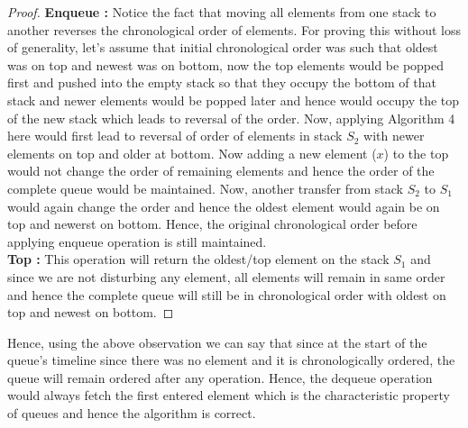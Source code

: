 \documentclass{article}
\begin{document}
{{\begin {proof}
        \textbf {Enqueue :} Notice the fact that moving all elements from one stack to another reverses the chronological order of elements. For proving this without loss of generality, let's assume that initial chronological order was such that oldest was on top and newest was on bottom, now the top elements would be popped first and pushed into the empty stack so that they occupy the bottom of that stack and newer elements would be popped later and hence would occupy the top of the new stack which leads to reversal of the order. Now, applying Algorithm 4 here would first lead to reversal of order of elements in stack $S_2$ with newer elements on top and older at bottom. Now adding a new element ($x$) to the top would not change the order of remaining elements and hence the order of the complete queue would be maintained. Now, another transfer from stack $S_2$ to $S_1$ would again change the order and hence the oldest element would again be on top and newerst on bottom. Hence, the original chronological order before applying enqueue operation is still maintained. \\
        \textbf {Top :} This operation will return the oldest/top element on the stack $S_1$ and since we are not disturbing any element, all elements will remain in same order and hence the complete queue will still be in chronological order with oldest on top and newest on bottom.
        \end {proof}
        \noindent Hence, using the above observation we can say that since at the start of the queue's timeline since there was no element and it is chronologically ordered, the queue will remain ordered after any operation. Hence, the dequeue operation would always fetch the first entered element which is the characteristic property of queues and hence the algorithm is correct. 
    }
}
\end{document}
